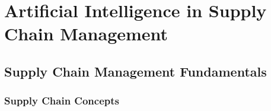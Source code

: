 \chapter{Artificial Intelligence in Supply Chain Management}

\section{Supply Chain Management Fundamentals}

\subsection{Supply Chain Concepts}

